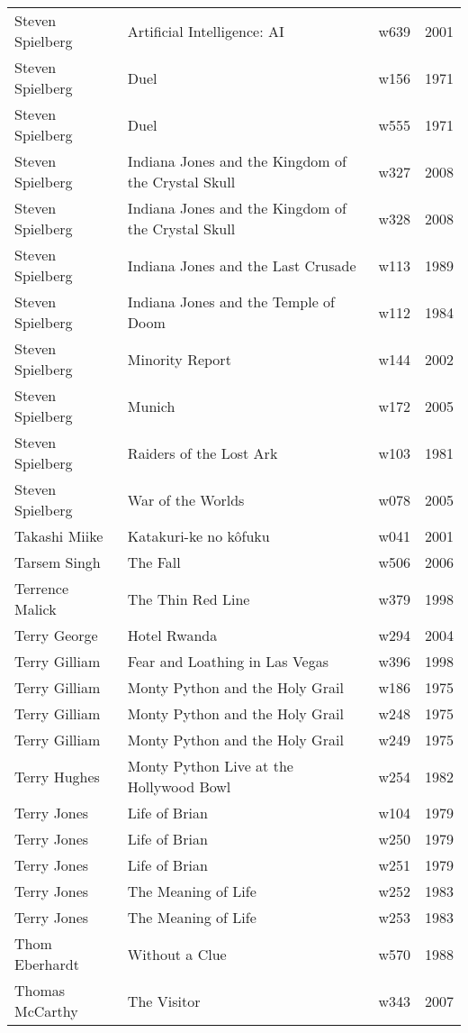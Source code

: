 \documentclass{article}
\begin{document}
\begin {center}
\begin{longtable}{l p{10cm} l l}
Steven Spielberg & Artificial Intelligence: AI & w639 & 2001 \\
Steven Spielberg & Duel & w156 & 1971 \\
Steven Spielberg & Duel & w555 & 1971 \\
Steven Spielberg & Indiana Jones and the Kingdom of the Crystal Skull & w327 & 2008 \\
Steven Spielberg & Indiana Jones and the Kingdom of the Crystal Skull & w328 & 2008 \\
Steven Spielberg & Indiana Jones and the Last Crusade & w113 & 1989 \\
Steven Spielberg & Indiana Jones and the Temple of Doom & w112 & 1984 \\
Steven Spielberg & Minority Report & w144 & 2002 \\
Steven Spielberg & Munich & w172 & 2005 \\
Steven Spielberg & Raiders of the Lost Ark & w103 & 1981 \\
Steven Spielberg & War of the Worlds & w078 & 2005 \\
Takashi Miike & Katakuri-ke no kôfuku & w041 & 2001 \\
Tarsem Singh & The Fall & w506 & 2006 \\
Terrence Malick & The Thin Red Line & w379 & 1998 \\
Terry George & Hotel Rwanda & w294 & 2004 \\
Terry Gilliam & Fear and Loathing in Las Vegas & w396 & 1998 \\
Terry Gilliam & Monty Python and the Holy Grail & w186 & 1975 \\
Terry Gilliam & Monty Python and the Holy Grail & w248 & 1975 \\
Terry Gilliam & Monty Python and the Holy Grail & w249 & 1975 \\
Terry Hughes & Monty Python Live at the Hollywood Bowl & w254 & 1982 \\
Terry Jones & Life of Brian & w104 & 1979 \\
Terry Jones & Life of Brian & w250 & 1979 \\
Terry Jones & Life of Brian & w251 & 1979 \\
Terry Jones & The Meaning of Life & w252 & 1983 \\
Terry Jones & The Meaning of Life & w253 & 1983 \\
Thom Eberhardt & Without a Clue & w570 & 1988 \\
Thomas McCarthy & The Visitor & w343 & 2007 \\

\end{longtable}
\end{center}
\end{document}
